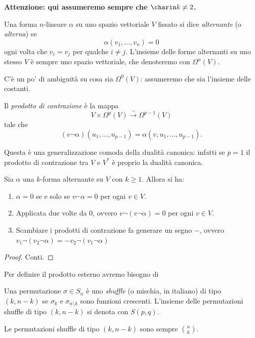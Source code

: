 \documentclass[11pt]{scrartcl}
\begin{document}
	\textbf{Attenzione: qui assumeremo sempre che $\charin k\ne 2$.}
	
	\begin{definition}
		Una forma $n$-lineare $\alpha$ su uno spazio vettoriale $V$ fissato si dice \textit{alternante} (o \textit{alterna}) se 
		$$\alpha(v_1,\dots,v_n)=0$$
		ogni volta che $v_i=v_j$ per qualche $i\ne j$. L'insieme delle forme alternanti su uno stesso $V$ è sempre uno spazio vettoriale, che denoteremo con $\Omega^n(V)$.
	\end{definition}
	C'è un po' di ambiguità su cosa sia $\Omega^0(V)$: assumeremo che sia l'insieme delle costanti.
	\begin{definition}
		Il \textit{prodotto di contrazione} è la mappa 
		$$V\times \Omega^p(V)\overset{\lnot}{\longrightarrow}\Omega^{p-1}(V)$$
		tale che
		$$(v\lnot \alpha)(u_1,\dots,u_{p-1})=\alpha\left(v,u_1,\dots,u_{p-1}\right).$$
	\end{definition}
	Questa è una generalizzazione comoda della dualità canonica: infatti se $p=1$ il prodotto di contrazione tra $V$ e $V^*$ è proprio la dualità canonica.
	\begin{lemma}
		Sia $\alpha$ una $k$-forma alternante su $V$ con $k\ge 1$. Allora si ha:
		\begin{enumerate}
			\item $\alpha=0$ se e solo se $v\invneg \alpha = 0$ per ogni $v\in V$.
			\item Applicata due volte da $0$, ovvero $v\lnot\left(v\lnot \alpha\right)=0$ per ogni $v\in V$. 
			\item Scambiare i prodotti di contrazione fa generare un segno $-$, ovvero $v_1\lnot (v_2\lnot\alpha)=-v_2\lnot\left(v_1\lnot\alpha\right)$
		\end{enumerate}
	\end{lemma}
	\begin{proof}
		Conti.
	\end{proof}
	Per definire il prodotto esterno avremo bisogno di
	\begin{definition}
		Una permutazione $\sigma\in S_n$ è uno \textit{shuffle} (o mischia, in italiano) di tipo $(k,n-k)$ se $\sigma_{\underline{k}}$ e $\sigma_{\underline{n}\setminus\underline{k}}$ sono funzioni crescenti. L'insieme delle permutazioni shuffle di tipo $(k,n-k)$ si denota con $S(p,q)$.
	\end{definition}
	Le permutazioni shuffle di tipo $(k,n-k)$ sono sempre $\binom{n}{k}$.
\end{document}
